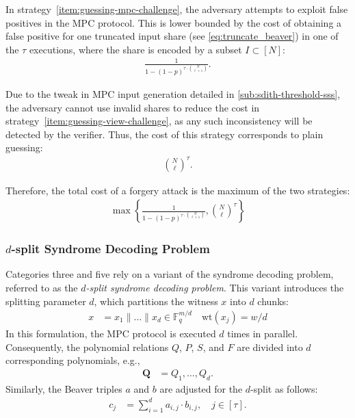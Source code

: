 \documentclass[11pt]{report}
\theoremstyle{definition}
\theoremstyle{plain}
\begin{document}
In strategy~\ref*{item:guessing-mpc-challenge}, the adversary attempts to exploit false positives in the MPC protocol. This is lower bounded by the cost of obtaining a false positive for one truncated input share (see \autoref{eq:truncate_beaver}) in one of the $\tau$ executions, where the share is encoded by a subset $I \subset [N]$:
\begin{align*}
  \frac{1}{1 - (1-p)^{\tau \cdot \binom{N}{\ell + 1}}}.
\end{align*}

Due to the tweak in MPC input generation detailed in \autoref{sub:sdith-threshold-sss}, the adversary cannot use invalid shares to reduce the cost in strategy~\ref*{item:guessing-view-challenge}, as any such inconsistency will be detected by the verifier. Thus, the cost of this strategy corresponds to plain guessing:
\begin{align*}
  \binom{N}{\ell}^\tau.
\end{align*}

Therefore, the total cost of a forgery attack is the maximum of the two strategies:
\begin{align}
  \max \left\{ \frac{1}{1 - (1-p)^{\tau \cdot \binom{N}{\ell + 1}}}, \binom{N}{\ell}^\tau \right\}\label{eq:forgery_attack_cost}
\end{align}

\subsubsection{$d$-split Syndrome Decoding Problem}

Categories three and five rely on a variant of the syndrome decoding problem, referred to as the \textit{$d$-split syndrome decoding problem}. This variant introduces the splitting parameter $d$, which partitions the witness $x$ into $d$ chunks:
\begin{align*}
  x & = x_1 \| \dots \| x_d \in \mathbb{F}_q^{m/d} \quad \text{wt}(x_j) = w/d
\end{align*}
In this formulation, the MPC protocol is executed $d$ times in parallel. Consequently, the polynomial relations $Q$, $P$, $S$, and $F$ are divided into $d$ corresponding polynomials, e.g.,
\begin{align*}
  \textbf{Q} & = Q_1, \dots, Q_d.
\end{align*}
Similarly, the Beaver triples $a$ and $b$ are adjusted for the $d$-split as follows:
\begin{align*}
  c_j & = \sum_{i=1}^d a_{i,j} \cdot b_{i,j}, \quad j \in [\tau].
\end{align*}
\end{document}
